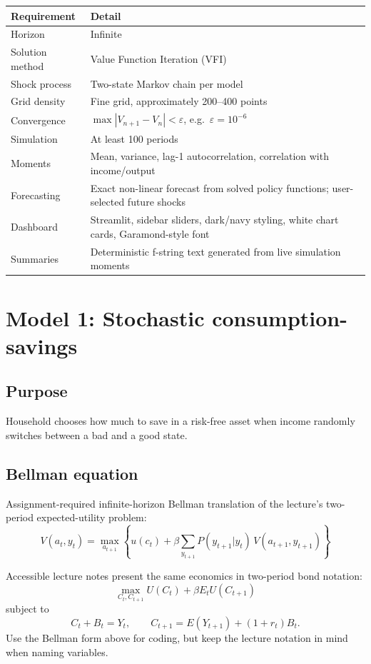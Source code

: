 \documentclass[11pt]{article}
\begin{document}
\begin{tabularx}{\linewidth}{@{}p{2.6cm}X@{}}
\toprule
\textbf{Requirement} & \textbf{Detail} \\
\midrule
Horizon & Infinite \\
Solution method & Value Function Iteration (VFI) \\
Shock process & Two-state Markov chain per model \\
Grid density & Fine grid, approximately 200--400 points \\
Convergence & $\max|V_{n+1}-V_n|<\varepsilon$, e.g.\ $\varepsilon=10^{-6}$ \\
Simulation & At least 100 periods \\
Moments & Mean, variance, lag-1 autocorrelation, correlation with income/output \\
Forecasting & Exact non-linear forecast from solved policy functions; user-selected future shocks \\
Dashboard & Streamlit, sidebar sliders, dark/navy styling, white chart cards, Garamond-style font \\
Summaries & Deterministic f-string text generated from live simulation moments \\
\bottomrule
\end{tabularx}

\bigskip

\section{Model 1: Stochastic consumption-savings}

\subsection{Purpose}
Household chooses how much to save in a risk-free asset when income randomly switches between a bad and a good state.

\subsection{Bellman equation}
Assignment-required infinite-horizon Bellman translation of the lecture's two-period expected-utility problem:
\[
V(a_t,y_t) = \max_{a_{t+1}} \left\{ u(c_t) + \beta \sum_{y_{t+1}} P(y_{t+1}|y_t)\,V(a_{t+1},y_{t+1}) \right\}
\]

\begin{notebox}
Accessible lecture notes present the same economics in two-period bond notation:
\[
\max_{C_t,C_{t+1}} U(C_t) + \beta E_t U(C_{t+1})
\]
subject to
\[
C_t + B_t = Y_t, \qquad C_{t+1} = E(Y_{t+1}) + (1+r_t)B_t.
\]
Use the Bellman form above for coding, but keep the lecture notation in mind when naming variables.
\end{notebox}
\end{document}
